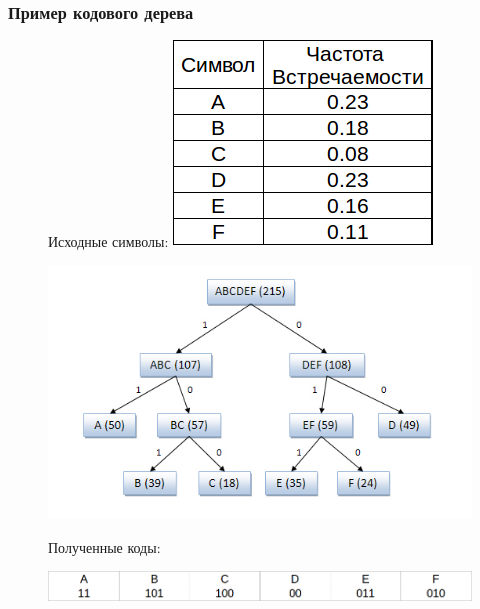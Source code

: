 \documentclass[10pt,pdf,hyperref={unicode}]{beamer}
\begin{document}
	\begin{frame}
		\frametitle{Пример кодового дерева}
			
		\begin{figure}
			\begin{minipage}{0.25\textwidth}
			\raggedright{\scriptsize{Исходные символы:}}
			\includegraphics[width=\textwidth]{tree_sym.png}
			\end{minipage}
			\begin{minipage}{0.74\textwidth}
			\includegraphics[width=\textwidth, trim= 20 20 50 15, clip=true]{tree.png}
			\end{minipage}
		\raggedright{Полученные коды:}
		
		\vspace{1em}
		\begin{minipage}[b]{\textwidth}
			\includegraphics[width=\textwidth]{tree_code.png}
		\end{minipage}
		\end{figure}
	\end{frame}
\end{document}
